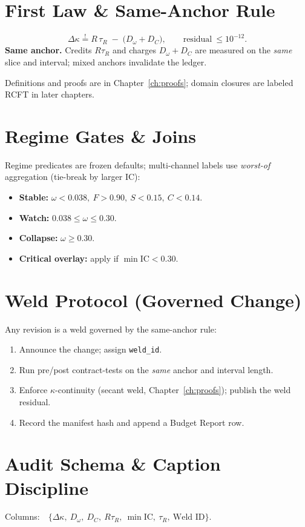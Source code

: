 \section{First Law \& Same-Anchor Rule}
\label{sec:firstlaw-statement}
\begin{eqbox}
\[
\Delta\kappa \stackrel{!}{=} R\,\tau_{R}\;-\;\bigl(D_{\omega}+D_{C}\bigr),
\qquad \text{residual}\ \le 10^{-12}.
\]
\textbf{Same anchor.} Credits $R\tau_{R}$ and charges $D_{\omega}+D_{C}$ are measured on the \emph{same} slice and interval; mixed anchors invalidate the ledger.
\end{eqbox}
Definitions and proofs are in Chapter~\ref{ch:proofs}; domain closures are labeled RCFT in later chapters.

\section{Regime Gates \& Joins}
\label{sec:contract-regimes}
Regime predicates are frozen defaults; multi-channel labels use \emph{worst-of} aggregation (tie-break by larger $\mathrm{IC}$):
\begin{itemize}
  \item \textbf{Stable:} $\omega<0.038,\ F>0.90,\ S<0.15,\ C<0.14$.
  \item \textbf{Watch:} $0.038\le \omega \le 0.30$.
  \item \textbf{Collapse:} $\omega\ge 0.30$.
  \item \textbf{Critical overlay:} apply if $\min\mathrm{IC}<0.30$.
\end{itemize}

\section{Weld Protocol (Governed Change)}
\label{sec:contract-weld}
Any revision is a weld governed by the same-anchor rule:
\begin{enumerate}
  \item Announce the change; assign \texttt{weld\_id}.
  \item Run pre/post contract-tests on the \emph{same} anchor and interval length.
  \item Enforce $\kappa$-continuity (secant weld, Chapter~\ref{ch:proofs}); publish the weld residual.
  \item Record the manifest hash and append a Budget Report row.
\end{enumerate}

\section{Audit Schema \& Caption Discipline}
\label{sec:contract-audit}
\begin{eqbox}
Columns:\ \ $\{\Delta\kappa,\ D_{\omega},\ D_{C},\ R\tau_{R},\ \min\mathrm{IC},\ \tau_{R},\ \text{Weld ID}\}$.
\end{eqbox}

